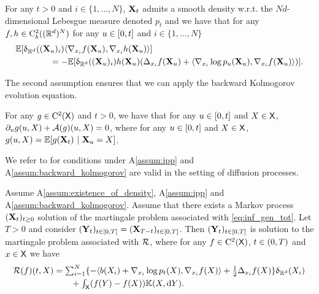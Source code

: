\begin{assumption}
  \label{assum:ipp}
  For any $t > 0$ and $i \in \{1, \dots, N\}$, $\mathbf{X}_t$ admits a smooth
  density w.r.t. the $Nd$-dimensional Lebesgue measure denoted $p_t$ and we have that for any
  $f, h \in \mathrm{C}_b^2((\mathbb{R}^d)^N)$
for any $u \in [ 0,t ]$ and $i \in \{1, \dots, N\}$
    \begin{align}
      &\mathbb{E}[\updelta_{\mathbb{R}^d}((\mathbf{X}_u)_i) \langle \nabla_{x_i} f(\mathbf{X}_u), \nabla_{x_i} h( \mathbf{X}_u) \rangle] \\
      & \qquad \qquad = -  \mathbb{E}[\updelta_{\mathbb{R}^d}((\mathbf{X}_u)_i) h(\mathbf{X}_u) (\Delta_{x_i} f(\mathbf{X}_u) + \langle \nabla_{x_i} \log p_u(\mathbf{X}_u), \nabla_{x_i} f(\mathbf{X}_u) \rangle)] .
    \end{align}  
\end{assumption}

The second assumption ensures that we can apply the backward Kolmogorov
evolution equation.

\begin{assumption}
  \label{assum:backward_kolmogorov}
  For any $g \in \mathrm{C}^2(\mathsf{X})$ and $t > 0$, we have that for any $u \in [ 0,t ]$ and
  $X \in \mathsf{X}$, $\partial_u g(u,X) + {\mathcal{A}}(g)(u,X) = 0$, where for any
  $u \in [ 0,t ]$ and $X \in \mathsf{X}$,
  $g(u,X) = \mathbb{E}[g(\mathbf{X}_t) \ | \ \mathbf{X}_u=X]$.
\end{assumption}

We refer to \citet{haussmann1986time} for conditions under A\ref{assum:ipp} and
A\ref{assum:backward_kolmogorov} are valid in the setting of diffusion processes.

  \begin{proposition}
    \label{prop:time_reversal_kill}
    Assume \textup{A\ref{assum:existence_of_density}}, \textup{A\ref{assum:ipp}}
    and \textup{A\ref{assum:backward_kolmogorov}}. Assume that there exists a
    Markov process $(\mathbf{X}_t)_{t \geq 0}$ solution of the martingale problem
    associated with \eqref{eq:inf_gen_tot}. Let $T > 0$ and consider
    $(\mathbf{Y}_t)_{t \in [ 0,T ]} = (\mathbf{X}_{T-t})_{t \in [ 0,T ]}$. Then
    $(\mathbf{Y}_t)_{t \in [ 0,T ]}$ is solution to the martingale problem
    associated with $\mathcal{R}$, where for any $f \in \mathrm{C}^2(\mathsf{X})$,
    $t \in ( 0,T )$ and $x \in \mathsf{X}$ we have
\begin{align}
  \label{eq:inf_gen_tot_rev}
  \mathcal{R}(f)(t, X) &\textstyle= \sum_{i=1}^N \{ -\langle b(X_i)+\nabla_{x_i} \log p_t(X), \nabla_{x_i}f(X) \rangle + \tfrac{1}{2} \Delta_{x_i}f(X)\} \updelta_{\mathbb{R}^d}(X_i) \\
  & \qquad  \textstyle + \int_{\mathsf{X}}(f(Y) - f(X))\mathbb{K}(X, \mathrm{d} Y) .
\end{align}
  \end{proposition}

